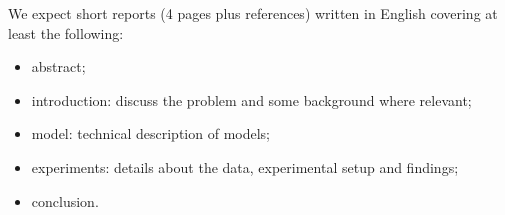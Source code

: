 We expect short reports (4 pages plus references) written in English covering at least the following:
\begin{itemize}
	\item abstract;
	\item introduction: discuss the problem and some background where relevant;
	\item model: technical description of models;
	\item experiments: details about the data, experimental setup and findings;
	\item conclusion.
\end{itemize}

